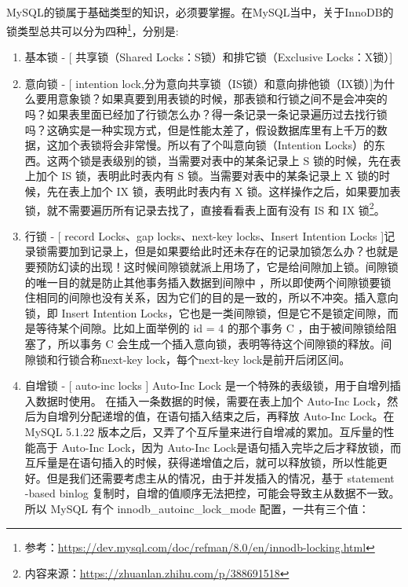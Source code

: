 \documentclass[../../../interview-questions.tex]{subfiles}
\begin{document}
\subsection{\color{red}{MySQL锁}}

MySQL的锁属于基础类型的知识，必须要掌握。在MySQL当中，关于InnoDB的锁类型总共可以分为四种\footnote{参考：\url{https://dev.mysql.com/doc/refman/8.0/en/innodb-locking.html}}，分别是:

\begin{enumerate}
    \item{基本锁 - [ 共享锁（Shared Locks：S锁）和排它锁（Exclusive Locks：X锁）]}
    \item{意向锁 - [ intention lock,分为意向共享锁（IS锁）和意向排他锁（IX锁）]}为什么要用意象锁？如果真要到用表锁的时候，那表锁和行锁之间不是会冲突的吗？如果表里面已经加了行锁怎么办？得一条记录一条记录遍历过去找行锁吗？这确实是一种实现方式，但是性能太差了，假设数据库里有上千万的数据，这加个表锁将会非常慢。所以有了个叫意向锁（Intention Locks）的东西。这两个锁是表级别的锁，当需要对表中的某条记录上 S 锁的时候，先在表上加个 IS 锁，表明此时表内有 S 锁。当需要对表中的某条记录上 X 锁的时候，先在表上加个 IX 锁，表明此时表内有 X 锁。这样操作之后，如果要加表锁，就不需要遍历所有记录去找了，直接看看表上面有没有 IS 和 IX 锁\footnote{内容来源：\url{https://zhuanlan.zhihu.com/p/388691518}}。
    \item{行锁 - [ record Locks、gap locks、next-key locks、Insert Intention Locks ]}记录锁需要加到记录上，但是如果要给此时还未存在的记录加锁怎么办？也就是要预防幻读的出现！这时候间隙锁就派上用场了，它是给间隙加上锁。间隙锁的唯一目的就是防止其他事务插入数据到间隙中 ，所以即使两个间隙锁要锁住相同的间隙也没有关系，因为它们的目的是一致的，所以不冲突。插入意向锁，即 Insert Intention Locks，它也是一类间隙锁，但是它不是锁定间隙，而是等待某个间隙。比如上面举例的 id = 4 的那个事务 C ，由于被间隙锁给阻塞了，所以事务 C 会生成一个插入意向锁，表明等待这个间隙锁的释放。间隙锁和行锁合称next-key lock，每个next-key lock是前开后闭区间。
    \item{自增锁 - [ auto-inc locks ] }Auto-Inc Lock 是一个特殊的表级锁，用于自增列插入数据时使用。 在插入一条数据的时候，需要在表上加个 Auto-Inc Lock，然后为自增列分配递增的值，在语句插入结束之后，再释放 Auto-Inc Lock。在 MySQL 5.1.22 版本之后，又弄了个互斥量来进行自增减的累加。互斥量的性能高于 Auto-Inc Lock，因为 Auto-Inc Lock是语句插入完毕之后才释放锁，而互斥量是在语句插入的时候，获得递增值之后，就可以释放锁，所以性能更好。但是我们还需要考虑主从的情况，由于并发插入的情况，基于 statement -based binlog 复制时，自增的值顺序无法把控，可能会导致主从数据不一致。所以 MySQL 有个 innodb\_autoinc\_lock\_mode 配置，一共有三个值：
    

\end{enumerate}
\end{document}
